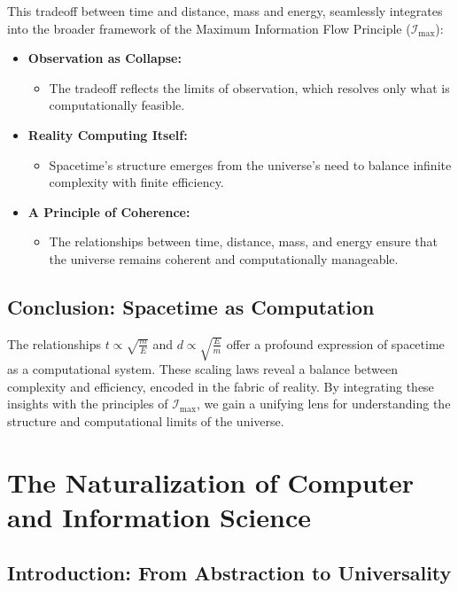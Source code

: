 \documentclass[12pt]{article}
\begin{document}
This tradeoff between time and distance, mass and energy, seamlessly integrates into the broader framework of the Maximum Information Flow Principle ($\mathcal{I}_{\text{max}}$):
\begin{itemize}
    \item \textbf{Observation as Collapse:}
    \begin{itemize}
        \item The tradeoff reflects the limits of observation, which resolves only what is computationally feasible.
    \end{itemize}

    \item \textbf{Reality Computing Itself:}
    \begin{itemize}
        \item Spacetime’s structure emerges from the universe’s need to balance infinite complexity with finite efficiency.
    \end{itemize}

    \item \textbf{A Principle of Coherence:}
    \begin{itemize}
        \item The relationships between time, distance, mass, and energy ensure that the universe remains coherent and computationally manageable.
    \end{itemize}
\end{itemize}

\subsection{Conclusion: Spacetime as Computation}

The relationships $t \propto \sqrt{\frac{m}{E}}$ and $d \propto \sqrt{\frac{E}{m}}$ offer a profound expression of spacetime as a computational system. These scaling laws reveal a balance between complexity and efficiency, encoded in the fabric of reality. By integrating these insights with the principles of $\mathcal{I}_{\text{max}}$, we gain a unifying lens for understanding the structure and computational limits of the universe.


\section{The Naturalization of Computer and Information Science}

\subsection{Introduction: From Abstraction to Universality}
\end{document}
